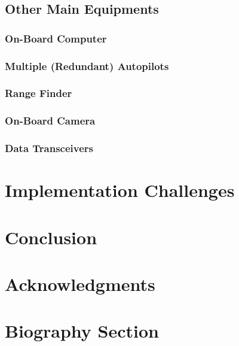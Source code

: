 \documentclass[lettersize,journal]{IEEEtran}
\begin{document}
\subsection{Other Main Equipments}
\subsubsection{On-Board Computer}
\subsubsection{Multiple (Redundant) Autopilots}
\subsubsection{Range Finder}
\subsubsection{On-Board Camera}
\subsubsection{Data Transceivers}

\section{Implementation Challenges}

\section{Conclusion}

\section*{Acknowledgments}



{}


\newpage

\section{Biography Section}

\vfill
\end{document}
